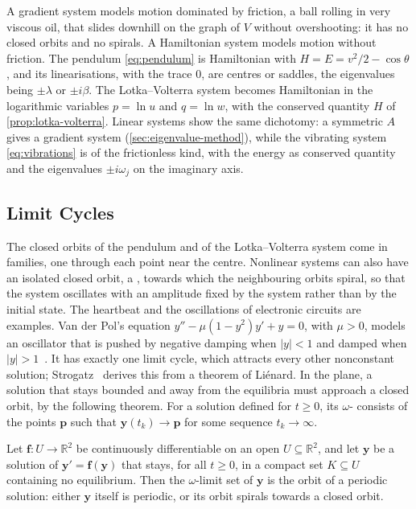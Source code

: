 A gradient system models motion dominated by friction, a ball rolling in very viscous oil, that slides downhill on the graph of $V$ without overshooting: it has no closed orbits and no spirals. A Hamiltonian system models motion without friction. The pendulum \eqref{eq:pendulum} is Hamiltonian with $H=E=v^2/2-\cos\theta$, and its linearisations, with the trace $0$, are centres or saddles, the eigenvalues being $\pm\lambda$ or $\pm i\beta$. The Lotka--Volterra system becomes Hamiltonian in the logarithmic variables $p=\ln u$ and $q=\ln w$, with the conserved quantity $H$ of \cref{prop:lotka-volterra}. Linear systems show the same dichotomy: a symmetric $A$ gives a gradient system (\cref{sec:eigenvalue-method}), while the vibrating system \eqref{eq:vibrations} is of the frictionless kind, with the energy as conserved quantity and the eigenvalues $\pm i\omega_j$ on the imaginary axis.

\subsection{Limit Cycles}

The closed orbits of the pendulum and of the Lotka--Volterra system come in families, one through each point near the centre. Nonlinear systems can also have an isolated closed orbit, a , towards which the neighbouring orbits spiral, so that the system oscillates with an amplitude fixed by the system rather than by the initial state. The heartbeat and the oscillations of electronic circuits are examples. Van der Pol's equation $y''-\mu(1-y^2)y'+y=0$, with $\mu>0$, models an oscillator that is pushed by negative damping when $|y|<1$ and damped when $|y|>1$~\cite{vanderpol1926}. It has exactly one limit cycle, which attracts every other nonconstant solution; Strogatz~\cite[Sect.~7.4]{strogatz2015} derives this from a theorem of Li\'enard. In the plane, a solution that stays bounded and away from the equilibria must approach a closed orbit, by the following theorem. For a solution defined for $t\ge0$, its $\omega$- consists of the points $\mathbf p$ such that $\mathbf y(t_k)\to\mathbf p$ for some sequence $t_k\to\infty$.

\begin{theorem}
\label{thm:poincare-bendixson}
Let $\mathbf f\colon U\to\mathbb R^2$ be continuously differentiable on an open $U\subseteq\mathbb R^2$, and let $\mathbf y$ be a solution of $\mathbf y'=\mathbf f(\mathbf y)$ that stays, for all $t\ge0$, in a compact set $K\subseteq U$ containing no equilibrium. Then the $\omega$-limit set of $\mathbf y$ is the orbit of a periodic solution: either $\mathbf y$ itself is periodic, or its orbit spirals towards a closed orbit.
\end{theorem}

